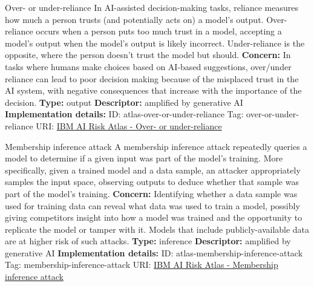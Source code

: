 \documentclass[a4paper,12pt]{article}
\begin{document}
\begin{definitionbox}{Over- or under-reliance}
In AI-assisted decision-making tasks, reliance measures how much a person trusts (and potentially acts on) a model's output. Over-reliance occurs when a person puts too much trust in a model, accepting a model's output when the model's output is likely incorrect. Under-reliance is the opposite, where the person doesn't trust the model but should.\newline\newline
\textbf{Concern: }In tasks where humans make choices based on AI-based suggestions, over/under reliance can lead to poor decision making because of the misplaced trust in the AI system, with negative consequences that increase with the importance of the decision.\newline\newline
\textbf{Type: }output\newline
\textbf{Descriptor: }amplified by generative AI \newline\newline
\textbf{Implementation details: } \newline
ID: atlas-over-or-under-reliance \newline
Tag: over-or-under-reliance \newline
URI:  \href{https://www.ibm.com/docs/en/watsonx/saas?topic=SSYOK8/wsj/ai-risk-atlas/over-or-under-reliance.html}{IBM AI Risk Atlas - Over- or under-reliance}\newline
\end{definitionbox}
\begin{definitionbox}{Membership inference attack}
A membership inference attack repeatedly queries a model to determine if a given input was part of the model's training. More specifically, given a trained model and a data sample, an attacker appropriately samples the input space, observing outputs to deduce whether that sample was part of the model's training.\newline\newline
\textbf{Concern: }Identifying whether a data sample was used for training data can reveal what data was used to train a model, possibly giving competitors insight into how a model was trained and the opportunity to replicate the model or tamper with it. Models that include publicly-available data are at higher risk of such attacks.\newline\newline
\textbf{Type: }inference\newline
\textbf{Descriptor: }amplified by generative AI \newline\newline
\textbf{Implementation details: } \newline
ID: atlas-membership-inference-attack \newline
Tag: membership-inference-attack \newline
URI:  \href{https://www.ibm.com/docs/en/watsonx/saas?topic=SSYOK8/wsj/ai-risk-atlas/membership-inference-attack.html}{IBM AI Risk Atlas - Membership inference attack}\newline
\end{definitionbox}
\end{document}
